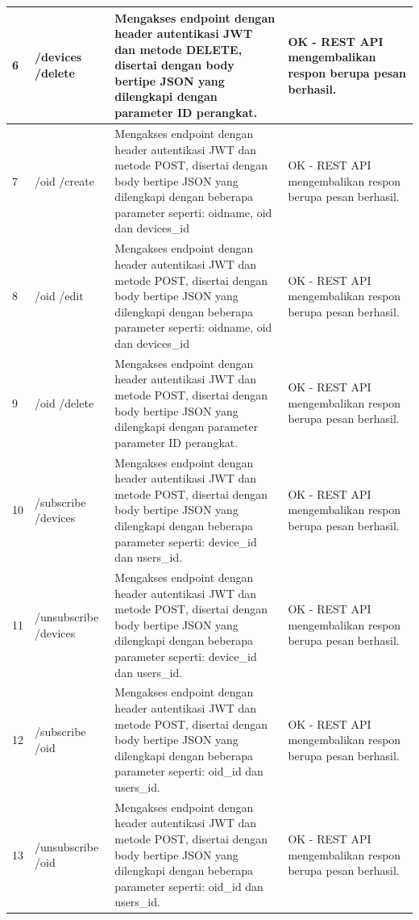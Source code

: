 \begin{longtable}{|p{}|p{}|p{}|p{}|}
        			6 & /devices /delete & Mengakses endpoint dengan header autentikasi JWT dan metode DELETE, disertai dengan body bertipe JSON yang dilengkapi dengan parameter ID perangkat. & OK - REST API mengembalikan respon berupa pesan berhasil. \\ \hline
        			7 & /oid /create & Mengakses endpoint dengan header autentikasi JWT dan metode POST, disertai dengan body bertipe JSON yang dilengkapi dengan beberapa parameter seperti: oidname, oid dan devices\_id & OK - REST API mengembalikan respon berupa pesan berhasil. \\ \hline
        			8 & /oid /edit & Mengakses endpoint dengan header autentikasi JWT dan metode POST, disertai dengan body bertipe JSON yang dilengkapi dengan beberapa parameter seperti: oidname, oid dan devices\_id & OK - REST API mengembalikan respon berupa pesan berhasil. \\ \hline
        			9 & /oid /delete & Mengakses endpoint dengan header autentikasi JWT dan metode POST, disertai dengan body bertipe JSON yang dilengkapi dengan parameter parameter ID perangkat. & OK - REST API mengembalikan respon berupa pesan berhasil. \\ \hline
        			10 & /subscribe /devices & Mengakses endpoint dengan header autentikasi JWT dan metode POST, disertai dengan body bertipe JSON yang dilengkapi dengan beberapa parameter seperti: device\_id dan users\_id. & OK - REST API mengembalikan respon berupa pesan berhasil. \\ \hline
        			11 & /unsubscribe /devices & Mengakses endpoint dengan header autentikasi JWT dan metode POST, disertai dengan body bertipe JSON yang dilengkapi dengan beberapa parameter seperti: device\_id dan users\_id. & OK - REST API mengembalikan respon berupa pesan berhasil. \\ \hline
        			12 & /subscribe /oid & Mengakses endpoint dengan header autentikasi JWT dan metode POST, disertai dengan body bertipe JSON yang dilengkapi dengan beberapa parameter seperti: oid\_id dan users\_id. & OK - REST API mengembalikan respon berupa pesan berhasil. \\ \hline
        			13 & /unsubscribe /oid & Mengakses endpoint dengan header autentikasi JWT dan metode POST, disertai dengan body bertipe JSON yang dilengkapi dengan beberapa parameter seperti: oid\_id dan users\_id. & OK - REST API mengembalikan respon berupa pesan berhasil. \\ \hline
        		\end{longtable}
    \pagebreak
